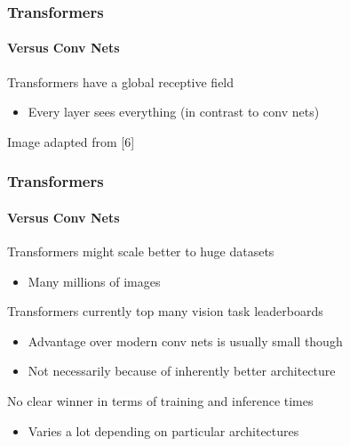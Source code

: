 \documentclass[xetex,professionalfont]{beamer}
\begin{document}
\begin{frame}
	\frametitle{Transformers}
	\framesubtitle{Versus Conv Nets}

	Transformers have a global receptive field
	\begin{itemize}
		\item Every layer sees everything (in contrast to conv nets)
	\end{itemize}

	\medskip

	\begin{center}
		{\centering Image adapted from [6]}
	\end{center}

\end{frame}


\begin{frame}
	\frametitle{Transformers}
	\framesubtitle{Versus Conv Nets}

	Transformers might scale better to huge datasets
	\begin{itemize}
		\item Many millions of images
	\end{itemize}

	\bigskip

	Transformers currently top many vision task leaderboards
	\begin{itemize}
		\item Advantage over modern conv nets is usually small though
		\item Not necessarily because of inherently better architecture
	\end{itemize}

	\bigskip

	No clear winner in terms of training and inference times
	\begin{itemize}
		\item Varies a lot depending on particular architectures
	\end{itemize}

\end{frame}
\end{document}
